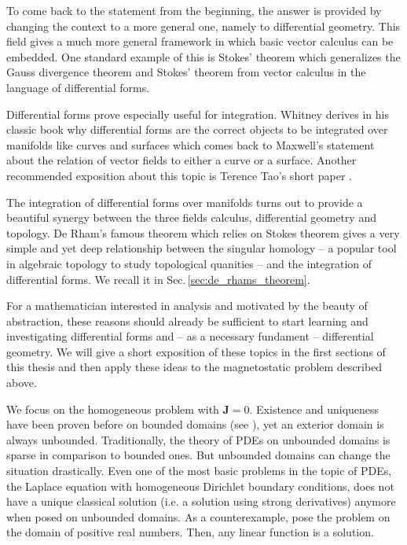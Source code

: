 \documentclass[../master_thesis.tex]{subfiles}
\begin{document}
To come back to the statement from the beginning, the answer is provided 
by changing the context to a more general one, namely to differential geometry. 
This field
gives a much more general framework in which basic vector calculus can 
be embedded. One standard example of this is Stokes' theorem 
which generalizes the Gauss divergence theorem and Stokes' theorem from vector calculus 
in the language of differential forms.

Differential forms prove especially useful for integration. 
Whitney derives in his classic book \cite{whitney} why differential forms are
the correct objects to be integrated over manifolds like curves and surfaces which comes back 
to Maxwell's statement about the relation 
of vector fields to either a curve or a surface. 
Another recommended exposition about this topic is Terence Tao's short paper \cite{terence_tao}. 

The integration of differential forms over manifolds turns out to provide 
a beautiful synergy between the three fields 
calculus, differential geometry and topology. De Rham's famous theorem which 
relies on Stokes theorem 
gives a very simple and yet deep relationship between the singular homology -- 
a popular tool in algebraic topology to study topological quanities -- 
and the integration of differential forms. We recall it in Sec.\,\ref{sec:de_rhams_theorem}.

For a mathematician interested in analysis and motivated by the beauty of abstraction, 
these reasons should already be sufficient to start learning and investigating 
differential forms and -- as a necessary fundament -- differential geometry. We will 
give a short exposition of these topics in the first sections of this thesis 
and then apply these ideas to the magnetostatic problem described above.

We focus on the homogeneous problem with $\mathbf{J} = 0$.
Existence and uniqueness have been proven before on bounded domains 
(see \cite[Thm.\,5.4]{mitrea_layer_potentials}),
yet an exterior domain is always unbounded. 
Traditionally, the theory of PDEs on unbounded domains 
is sparse in comparison to bounded ones. But unbounded domains can change the 
situation drastically. Even one of the most basic problems in the topic 
of PDEs, the Laplace equation with homogeneous Dirichlet boundary conditions, does not 
have a unique classical solution (i.e. a solution using strong derivatives) 
anymore when posed on unbounded domains. As a counterexample,
pose the problem on the domain of positive real numbers. Then, any linear function 
is a solution.
\end{document}
